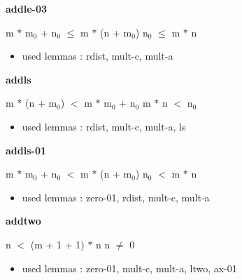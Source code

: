 \documentclass[a4paper]{article}
\begin{document}
\medskip

\bigskip

{\large\bf addle-03}

\medskip

 \Fol m $*$ $\mbox{m}_{0}$ + $\mbox{n}_{0}$ $\le$ m $*$ (n + $\mbox{m}_{0}$) \Equiv $\mbox{n}_{0}$ $\le$ m $*$ n

\begin{itemize}


\item       used lemmas  : rdist, mult-c, mult-a

\end{itemize}

\medskip

\bigskip

{\large\bf addls}

\medskip

 \Fol m $*$ (n + $\mbox{m}_{0}$) $<$ m $*$ $\mbox{m}_{0}$ + $\mbox{n}_{0}$ \Equiv m $*$ n $<$ $\mbox{n}_{0}$

\begin{itemize}


\item       used lemmas  : rdist, mult-c, mult-a, ls

\end{itemize}

\medskip

\bigskip

{\large\bf addls-01}

\medskip

 \Fol m $*$ $\mbox{m}_{0}$ + $\mbox{n}_{0}$ $<$ m $*$ (n + $\mbox{m}_{0}$) \Equiv $\mbox{n}_{0}$ $<$ m $*$ n

\begin{itemize}


\item       used lemmas  : zero-01, rdist, mult-c, mult-a

\end{itemize}

\medskip

\bigskip

{\large\bf addtwo}

\medskip

 \Fol n $<$ (m + 1 + 1) $*$ n \Equiv n $\neq$ 0

\begin{itemize}


\item       used lemmas  : zero-01, mult-c, mult-a, ltwo, ax-01

\end{itemize}
\end{document}

